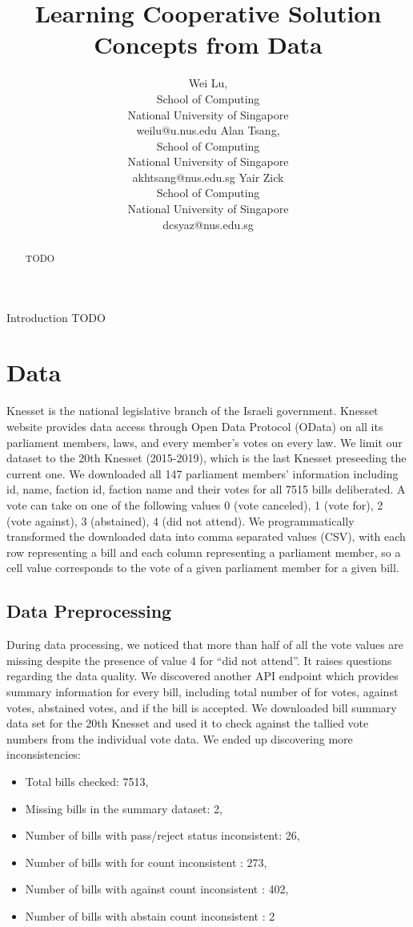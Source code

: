 \documentclass[letterpaper]{article} %
\title{Learning Cooperative Solution Concepts from Data}
\author{Wei Lu,\\
School of Computing\\
National University of Singapore\\
weilu@u.nus.edu
\And
Alan Tsang,\\
School of Computing\\
National University of Singapore\\
akhtsang@nus.edu.sg
\And
Yair Zick\\
School of Computing\\
National University of Singapore\\
dcsyaz@nus.edu.sg
}
\begin{document}
\maketitle

\begin{abstract}
TODO
\end{abstract}

\noindent Introduction TODO

\section{Data}
Knesset is the national legislative branch of the Israeli government. Knesset website provides data access through Open Data Protocol (OData) on all its parliament members, laws, and every member's votes on every law. We limit our dataset to the 20th Knesset (2015-2019), which is the last Knesset preseeding the current one. We downloaded all 147 parliament members' information including id, name, faction id, faction name and their votes for all 7515 bills deliberated. A vote can take on one of the following values 0 (vote canceled), 1 (vote for), 2 (vote against), 3 (abstained), 4 (did not attend). We programmatically transformed the downloaded data into comma separated values (CSV), with each row representing a bill and each column representing a parliament member, so a cell value corresponds to the vote of a given parliament member for a given bill.

\subsection{Data Preprocessing}
During data processing, we noticed that more than half of all the vote values are missing despite the presence of value 4 for ``did not attend''. It raises questions regarding the data quality. We discovered another API endpoint which provides summary information for every bill, including total number of for votes, against votes, abstained votes, and if the bill is accepted. We downloaded bill summary data set for the 20th Knesset and used it to check against the tallied vote numbers from the individual vote data. We ended up discovering more inconsistencies:

\begin{itemize}
  \item Total bills checked: 7513,
  \item Missing bills in the summary dataset: 2,
  \item Number of bills with pass/reject status inconsistent: 26,
  \item Number of bills with for count inconsistent : 273,
  \item Number of bills with against count inconsistent : 402,
  \item Number of bills with abstain count inconsistent : 2
\end{itemize}
\end{document}
